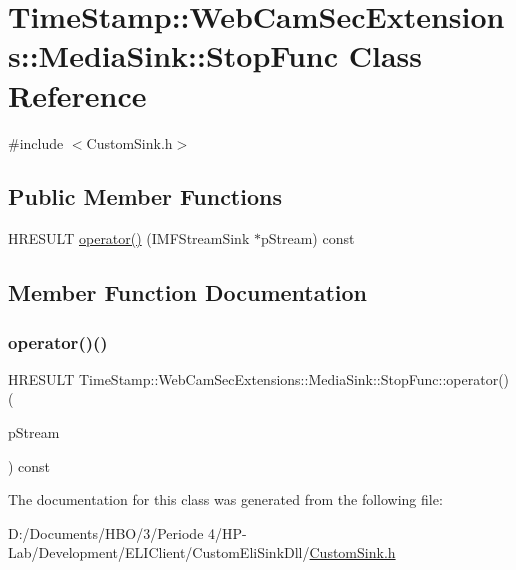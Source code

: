 \hypertarget{class_time_stamp_1_1_web_cam_sec_extensions_1_1_media_sink_1_1_stop_func}{}\section{Time\+Stamp\+:\+:Web\+Cam\+Sec\+Extensions\+:\+:Media\+Sink\+:\+:Stop\+Func Class Reference}
\label{class_time_stamp_1_1_web_cam_sec_extensions_1_1_media_sink_1_1_stop_func}


{\ttfamily \#include $<$Custom\+Sink.\+h$>$}

\subsection*{Public Member Functions}
\begin{DoxyCompactItemize}
\item 
H\+R\+E\+S\+U\+LT \hyperlink{class_time_stamp_1_1_web_cam_sec_extensions_1_1_media_sink_1_1_stop_func_a43e6d31fd08c424d7003f63d6d023fbf}{operator()} (I\+M\+F\+Stream\+Sink $\ast$p\+Stream) const
\end{DoxyCompactItemize}


\subsection{Member Function Documentation}
\mbox{\label{class_time_stamp_1_1_web_cam_sec_extensions_1_1_media_sink_1_1_stop_func_a43e6d31fd08c424d7003f63d6d023fbf}} 
\subsubsection{\texorpdfstring{operator()()}{operator()()}}
{\footnotesize\ttfamily H\+R\+E\+S\+U\+LT Time\+Stamp\+::\+Web\+Cam\+Sec\+Extensions\+::\+Media\+Sink\+::\+Stop\+Func\+::operator() (\begin{DoxyParamCaption}\item[{I\+M\+F\+Stream\+Sink $\ast$}]{p\+Stream }\end{DoxyParamCaption}) const\hspace{0.3cm}{\ttfamily [inline]}}



The documentation for this class was generated from the following file\+:\begin{DoxyCompactItemize}
\item 
D\+:/\+Documents/\+H\+B\+O/3/\+Periode 4/\+H\+P-\/\+Lab/\+Development/\+E\+L\+I\+Client/\+Custom\+Eli\+Sink\+Dll/\hyperlink{_custom_sink_8h}{Custom\+Sink.\+h}\end{DoxyCompactItemize}

